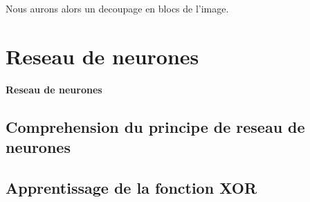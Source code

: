\documentclass[a4paper, 12pt]{report}
\begin{document}
	 
	 Nous aurons alors un decoupage en blocs de l'image. \\ 
	 
	
	\chapter{Reseau de neurones} 

\newpage

\huge {\bfseries Reseau de neurones } \\
	
	\section{Comprehension du principe de reseau de neurones}
	
	\section{Apprentissage de la fonction XOR}
\end{document}

